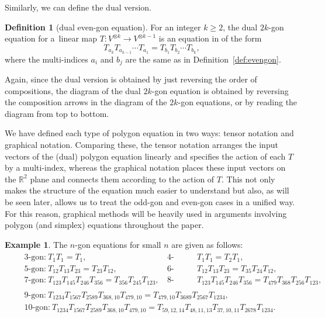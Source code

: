 \documentclass[pdftex]{sigma}
\numberwithin{equation}{section}
\theoremstyle{definition}
\newtheorem{Definition}[Theorem]{Definition}
\newtheorem{Example}[Theorem]{Example}
\begin{document}
Similarly, we can define the dual version.
\begin{Definition}[dual even-gon equation]
 For an integer $k\geq 2$, the dual $2k$-gon equation for a~linear map $T\colon V^{\otimes k}\to V^{\otimes k-1}$ is an equation in  of the form
 \begin{equation*}
 T_{a_k}T_{a_{k-1}}\cdots T_{a_1} = T_{b_1}T_{b_2}\cdots T_{b_k},
 \end{equation*}
 where the multi-indices $a_i$ and $b_j$ are the same as in Definition~\ref{def:evengon}.

 Again, since the dual version is obtained by just reversing the order of compositions, the diagram of the dual $2k$-gon equation is obtained by reversing the composition arrows in the diagram of the $2k$-gon equations, or by reading the diagram from top to bottom.
\end{Definition}



We have defined each type of polygon equation in two ways: tensor notation and graphical notation. Comparing these, the tensor notation arranges the input vectors of the (dual) polygon equation linearly and specifies the action of each $T$ by a multi-index, whereas the graphical notation places these input vectors on the $\mathbb{R}^2$ plane and connects them according to the action of $T$. This not only makes the structure of the equation much easier to understand but also, as will be seen later, allows us to treat the odd-gon and even-gon cases in a unified way. For this reason, graphical methods will be heavily used in arguments involving polygon (and simplex) equations throughout the paper.



\begin{Example}
 The $n$-gon equations for small $n$ are given as follows:
\begin{align*}
 &\begin{aligned}
 &\text{{3-gon:}}\ T_{1}T_{1}=T_{1}, & \text{{4-gon:}}&\quad T_{1}T_{1}=T_{2}T_{1},\\
 &\text{{5-gon:}}\ T_{12}T_{13}T_{23}=T_{23}T_{12}, & \text{{6-gon:}}&\quad T_{12}T_{13}T_{23}=T_{35}T_{24}T_{12},\\
 &\text{{7-gon:}}\ T_{123}T_{145}T_{246}T_{356}=T_{356}T_{245}T_{123},\quad & \text{{8-gon:}}&\quad T_{123}T_{145}T_{246}T_{356}=T_{479}T_{368}T_{256}T_{123},
 \end{aligned}\\
 &\begin{aligned}
 &\text{{9-gon:}}\ T_{1234}T_{1567}T_{2589}T_{368,10}T_{479,10}=T_{479,10}T_{3689}T_{2567}T_{1234},\\
 &\text{{10-gon:}}\ T_{1234}T_{1567}T_{2589}T_{368,10}T_{479,10}=T_{59,12,14}T_{48,11,13}T_{37,10,11}T_{2678}T_{1234}.
 \end{aligned}
\end{align*}
\end{Example}
\end{document}

